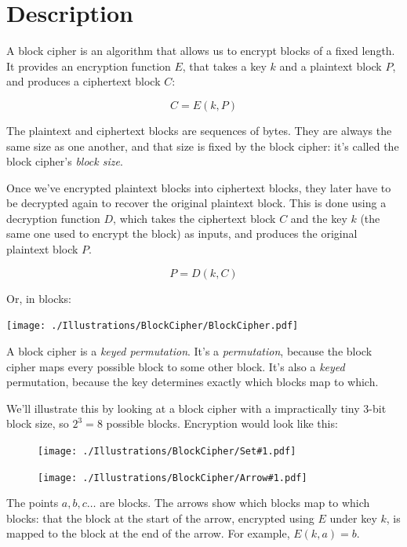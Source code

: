 \documentclass[11pt,ebook,table,dvipsnames]{memoir}
\begin{document}
\section{Description}
\label{sec-2-2-1}
A \gls{block cipher} is an algorithm that allows us to encrypt blocks
of a fixed length. It provides an encryption function $E$, that takes
a key $k$ and a plaintext block $P$, and produces a ciphertext block
$C$:

\begin{equation}
C = E(k, P)
\end{equation}

The plaintext and ciphertext blocks are sequences of bytes. They are
always the same size as one another, and that size is fixed by the
block cipher: it's called the block cipher's \emph{block size}.

Once we've encrypted plaintext blocks into ciphertext blocks, they
later have to be decrypted again to recover the original plaintext
block. This is done using a decryption function $D$, which takes the
ciphertext block $C$ and the key $k$ (the same one used to encrypt the
block) as inputs, and produces the original plaintext block $P$.

\begin{equation}
P = D(k, C)
\end{equation}

Or, in blocks:

\texttt{[image: ./Illustrations/BlockCipher/BlockCipher.pdf]}

\newcommand{\permutationimg}[1] {
\begin{figure}[ht!]
  \centering
  \texttt{[image: ./Illustrations/BlockCipher/Set\#1.pdf]}

  \texttt{[image: ./Illustrations/BlockCipher/Arrow\#1.pdf]}
\end{figure}
}

A block cipher is a \emph{keyed permutation}. It's a \emph{permutation}, because
the block cipher maps every possible block to some other block. It's
also a \emph{keyed} permutation, because the key determines exactly which
blocks map to which.

We'll illustrate this by looking at a block cipher with a
impractically tiny 3-bit block size, so $2^3 = 8$ possible blocks.
Encryption would look like this:

\permutationimg{Ek}

The points $a, b, c\ldots$ are blocks. The arrows show which blocks
map to which blocks: that the block at the start of the arrow,
encrypted using $E$ under key $k$, is mapped to the block at the end
of the arrow. For example, $E(k, a) = b$.
\end{document}
